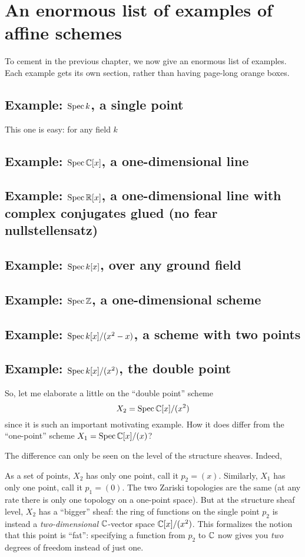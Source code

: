 \chapter{An enormous list of examples of affine schemes}

To cement in the previous chapter,
we now give an enormous list of examples.
Each example gets its own section,
rather than having page-long orange boxes.


\section{Example: $\operatorname{Spec} k$, a single point}
This one is easy: for any field $k$

\section{Example: $\operatorname{Spec} \mathbb C[x]$, a one-dimensional line}
\section{Example: $\operatorname{Spec} \mathbb R[x]$, a one-dimensional line with complex conjugates glued (no fear nullstellensatz)}
\section{Example: $\operatorname{Spec} k[x]$, over any ground field}
\section{Example: $\operatorname{Spec} \mathbb Z$, a one-dimensional scheme}

\section{Example: $\operatorname{Spec} k[x] / (x^2-x)$, a scheme with two points}
\section{Example: $\operatorname{Spec} k[x]/(x^2)$, the double point}
So, let me elaborate a little on the ``double point'' scheme
\[ X_2 = \operatorname{Spec} \mathbb C[x] / (x^2) \]
since it is such an important motivating example.
How it does differ from the ``one-point'' scheme $X_1 = \operatorname{Spec} \mathbb C[x] / (x)$?

The difference can only be seen on the level of the structure sheaves.
Indeed,
\begin{itemize}
	\ii As a set of points, $X_2$ has only one point, call it $p_2 = (x)$.
	Similarly, $X_1$ has only one point, call it $p_1 = (0)$.
	\ii The two Zariski topologies are the same
	(at any rate there is only one topology on a one-point space).
	\ii But at the structure sheaf level, $X_2$ has a ``bigger'' sheaf:
	the ring of functions on the single point $p_2$ is instead
	a \emph{two-dimensional} $\mathbb C$-vector space $\mathbb C[x]/(x^2)$.
	This formalizes the notion that this point is ``fat'':
	specifying a function from $p_2$ to $\mathbb C$ now gives you
	\emph{two} degrees of freedom instead of just one.
\end{itemize}

